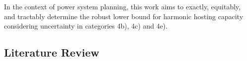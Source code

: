 In the context of power system planning, this work aims to exactly, equitably, and tractably determine the robust lower bound for harmonic hosting capacity considering uncertainty in categories 4b), 4c) and 4e). 

\subsection{Literature Review}
\label{sec:literature_review}

